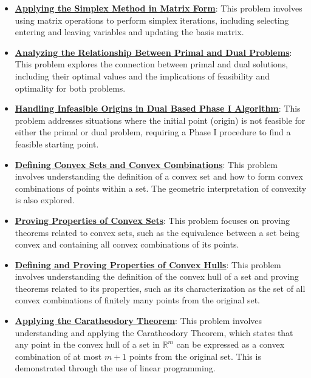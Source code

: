 \documentclass{article}%
\begin{document}
\begin{itemize}[leftmargin=*]
\item \href{https://www.math.purdue.edu/~yipn/421/2024-10-03-DualSimplexMatrix.pdf#page=7}{\textbf{Applying the Simplex Method in Matrix Form}}: This problem involves using matrix operations to perform simplex iterations, including selecting entering and leaving variables and updating the basis matrix. %
\item \href{https://www.math.purdue.edu/~yipn/421/2024-10-03-DualSimplexMatrix.pdf#page=1}{\textbf{Analyzing the Relationship Between Primal and Dual Problems}}: This problem explores the connection between primal and dual solutions, including their optimal values and the implications of feasibility and optimality for both problems. %
\item \href{https://www.math.purdue.edu/~yipn/421/2024-10-03-DualSimplexMatrix.pdf#page=5}{\textbf{Handling Infeasible Origins in Dual Based Phase I Algorithm}}: This problem addresses situations where the initial point (origin) is not feasible for either the primal or dual problem, requiring a Phase I procedure to find a feasible starting point. %
\item \href{https://www.math.purdue.edu/~yipn/421/2024-10-22-Convexity.pdf#page=1}{\textbf{Defining Convex Sets and Convex Combinations}}: This problem involves understanding the definition of a convex set and how to form convex combinations of points within a set. The geometric interpretation of convexity is also explored. %
\item \href{https://www.math.purdue.edu/~yipn/421/2024-10-22-Convexity.pdf#page=2}{\textbf{Proving Properties of Convex Sets}}: This problem focuses on proving theorems related to convex sets, such as the equivalence between a set being convex and containing all convex combinations of its points. %
\item \href{https://www.math.purdue.edu/~yipn/421/2024-10-22-Convexity.pdf#page=5}{\textbf{Defining and Proving Properties of Convex Hulls}}: This problem involves understanding the definition of the convex hull of a set and proving theorems related to its properties, such as its characterization as the set of all convex combinations of finitely many points from the original set. %
\item \href{https://www.math.purdue.edu/~yipn/421/2024-10-22-Convexity.pdf#page=9}{\textbf{Applying the Caratheodory Theorem}}: This problem involves understanding and applying the Caratheodory Theorem, which states that any point in the convex hull of a set in $\mathbb{R}^m$ can be expressed as a convex combination of at most $m+1$ points from the original set. This is demonstrated through the use of linear programming. %

\end{itemize}
\end{document}
